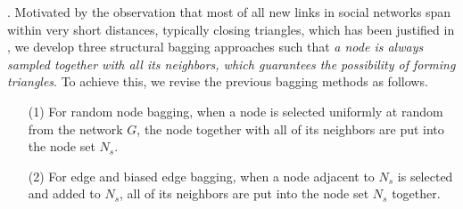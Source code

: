 . Motivated by the observation that most of all new links in social networks span within very short distances, typically closing triangles, which has been justified in \cite{leskovec-2008}, we develop three structural bagging approaches such that {\em a node is always sampled together
with all its neighbors, which guarantees the possibility of forming triangles}. To achieve this, we revise the previous bagging methods as follows.
\vspace{-1ex}
\begin{enumerate}
\item[(1)]
For random node bagging, when a node is selected uniformly at random from the network $G$, the node together with all of
its neighbors are put into the node set $N_s$.
\item[(2)]
For edge and biased edge bagging, when a node adjacent to $N_s$ is
 selected and added to $N_s$, all of its neighbors are put into the node set $N_s$ together.
\end{enumerate}
\vspace{-1ex}

